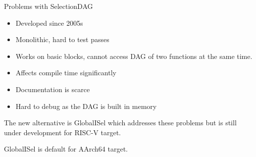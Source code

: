 \begin{frame}{Problems with SelectionDAG}
    \begin{itemize}
        \item Developed since 2005s
        \item Monolithic, hard to test passes
        \item Works on basic blocks, cannot access DAG of two functions at the same time.
        \item Affects compile time significantly
        \item Documentation is scarce
        \item Hard to debug as the DAG is built in memory
    \end{itemize}
    The new alternative is GlobalISel which addresses these problems but is still under development for RISC-V target.

    GlobalISel is default for AArch64 target.
\end{frame}
